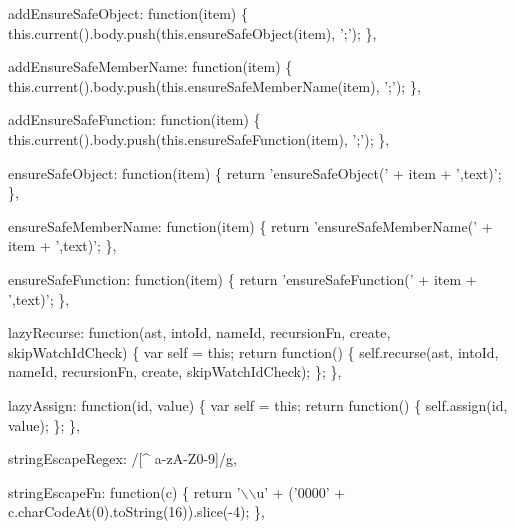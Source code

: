 \begin{DoxyCodeInclude}
{{{  addEnsureSafeObject: \textcolor{keyword}{function}(item) \{
    this.current().body.push(this.ensureSafeObject(item), \textcolor{charliteral}{';'});
  \},

  addEnsureSafeMemberName: \textcolor{keyword}{function}(item) \{
    this.current().body.push(this.ensureSafeMemberName(item), \textcolor{charliteral}{';'});
  \},

  addEnsureSafeFunction: \textcolor{keyword}{function}(item) \{
    this.current().body.push(this.ensureSafeFunction(item), \textcolor{charliteral}{';'});
  \},

  ensureSafeObject: \textcolor{keyword}{function}(item) \{
    \textcolor{keywordflow}{return} \textcolor{stringliteral}{'ensureSafeObject('} + item + \textcolor{stringliteral}{',text)'};
  \},

  ensureSafeMemberName: \textcolor{keyword}{function}(item) \{
    \textcolor{keywordflow}{return} \textcolor{stringliteral}{'ensureSafeMemberName('} + item + \textcolor{stringliteral}{',text)'};
  \},

  ensureSafeFunction: \textcolor{keyword}{function}(item) \{
    \textcolor{keywordflow}{return} \textcolor{stringliteral}{'ensureSafeFunction('} + item + \textcolor{stringliteral}{',text)'};
  \},

  lazyRecurse: \textcolor{keyword}{function}(ast, intoId, nameId, recursionFn, create, skipWatchIdCheck) \{
    var \textcolor{keyword}{self} = \textcolor{keyword}{this};
    \textcolor{keywordflow}{return} \textcolor{keyword}{function}() \{
      \textcolor{keyword}{self}.recurse(ast, intoId, nameId, recursionFn, create, skipWatchIdCheck);
    \};
  \},

  lazyAssign: \textcolor{keyword}{function}(id, value) \{
    var \textcolor{keyword}{self} = \textcolor{keyword}{this};
    \textcolor{keywordflow}{return} \textcolor{keyword}{function}() \{
      \textcolor{keyword}{self}.assign(\textcolor{keywordtype}{id}, value);
    \};
  \},

  stringEscapeRegex: /[^ a-zA-Z0-9]/g,

  stringEscapeFn: \textcolor{keyword}{function}(c) \{
    \textcolor{keywordflow}{return} \textcolor{stringliteral}{'\(\backslash\)\(\backslash\)u'} + (\textcolor{stringliteral}{'0000'} + c.charCodeAt(0).toString(16)).slice(-4);
  \},

}}}
\end{DoxyCodeInclude}
